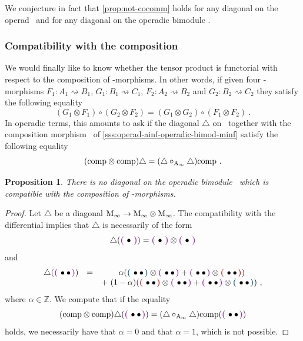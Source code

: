 \documentclass[twoside, 11pt]{amsart}
\newtheorem{proposition}[definition]{Proposition}
\theoremstyle{remark}
\begin{document}
\noindent We conjecture in fact that \cref{prop:not-cocomm} holds for any diagonal on the operad \Ainf\ and for any diagonal on the operadic bimodule \Minf .
 
\subsubsection{Compatibility with the composition} \label{sss:comp-composition}

We would finally like to know whether the tensor product is functorial with respect to the composition of \Ainf -morphisms. 
In other words, if given four \Ainf -morphisms $F_1 : A_1 \rightsquigarrow B_1$, 
$G_1 : B_1 \rightsquigarrow C_1$, $F_2 : A_2 \rightsquigarrow B_2$ and
$G_2 : B_2 \rightsquigarrow C_2$ they satisfy the following equality
\[ ( G_1 \otimes F_1) \circ (G_2 \otimes F_2) = (G_1 \otimes G_2) \circ (F_1 \otimes F_2) \ . \]
In operadic terms, this amounts to ask if the diagonal $\triangle$ on \Minf\ together with the composition morphism \comp\ of \cref{sss:operad-ainf-operadic-bimod-minf} satisfy the following equality 
\[ ( \mathrm{comp} \otimes \mathrm{comp} ) \triangle = (\triangle \circ_{\mathrm{A}_\infty} \triangle ) \mathrm{comp}   \ . \]

\begin{proposition} 
  \label{thm:nofunctorial}
  There is no diagonal on the operadic bimodule \Minf\ which is compatible with the composition of \Ainf -morphisms.  
\end{proposition}

\begin{proof} 
  Let $\triangle$ be a diagonal $\mathrm{M}_\infty \rightarrow \mathrm{M}_\infty \otimes \mathrm{M}_\infty$.
  The compatibility with the differential implies that $\triangle$ is necessarily of the form
  \[
      \triangle(\purple{\bullet }) = \purple{\bullet } \otimes \purple{\bullet } \]
and
\[ \begin{matrix}
      \triangle (\purple{\bullet \bullet }) &= &\alpha (\blue{\bullet \bullet }\otimes \purple{\bullet \bullet } + \purple{\bullet \bullet }\otimes\red{\bullet \bullet }) \\ & &+ \ (1-\alpha)(\red{\bullet \bullet }\otimes \purple{\bullet \bullet }+\purple{\bullet \bullet}\otimes \blue{\bullet \bullet}) \ ,
  \end{matrix} \]
  where $\alpha \in \mathbb{Z}$.
  We compute that if the equality
  \[ ( \comp \otimes \comp ) \triangle ( \purple{\bullet \bullet} ) = (\triangle \circ_{\Ainf} \triangle ) \comp  ( \purple{\bullet \bullet} ) \]
  holds, we necessarily have that $\alpha = 0$ and that $\alpha =1$, which is not possible.
\end{proof}
\end{document}
